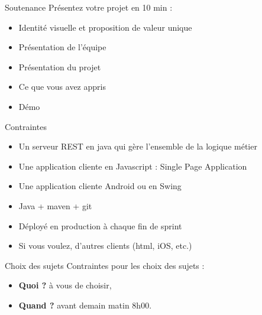 \documentclass{beamer}
\begin{document}
\begin{frame}{Soutenance}
  Présentez votre projet en 10 min :
  \begin{itemize}
    \item Identité visuelle et proposition de valeur unique
    \item Présentation de l'équipe
    \item Présentation du projet
    \item Ce que vous avez appris
    \item Démo
  \end{itemize}

\end{frame}

\begin{frame}{Contraintes}
  \begin{itemize}
    \item Un serveur REST en java qui gère l'ensemble de la logique métier
    \item Une application cliente en Javascript : Single Page Application
    \item Une application cliente Android ou en Swing
    \item Java + maven + git
    \item Déployé en production à chaque fin de sprint
    \item Si vous voulez, d'autres clients (html, iOS, etc.)
  \end{itemize}
\end{frame}

\begin{frame}{Choix des sujets}
  Contraintes pour les choix des sujets : 
  \begin{itemize}
    \item \textbf{Quoi ?} à vous de choisir,
    \item \textbf{Quand ?} avant demain matin 8h00.
  \end{itemize}
\end{frame}
\end{document}
